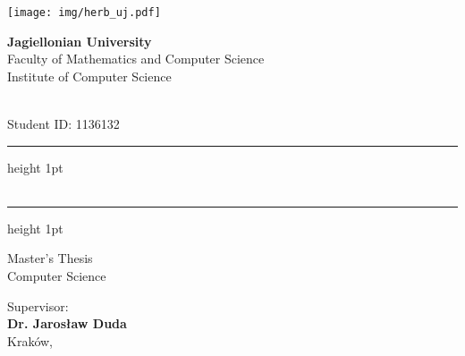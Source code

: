 \begin{titlepage}
  \setlength{\parindent}{0pt}
  \setlength{\parskip}{0pt}
  \makeatletter
  \def\myhrulefill{\leavevmode\leaders\hrule height 1pt\hfill\kern\z@}
  \makeatother

  \centering

  \texttt{[image: img/herb\_uj.pdf]}

  \vspace{0.5em}

  \Large
  \textbf{Jagiellonian University}\\
  \large
  Faculty of Mathematics and Computer Science\\
  Institute of Computer Science
  \normalsize

  \vspace{4em}

  \large
  \makeatletter
  \textbf{\@author}
  \makeatother
  \\
  \normalsize
  Student ID: 1136132

  \vspace{4em}

  \myhrulefill\\
  \huge
  \makeatletter
  \textbf{\textsc{
    \@title
  }}
  \makeatother
  \\
  \vspace{-0.5em}
  \myhrulefill

  \normalsize
  \vspace{4em}

  \large
  Master's Thesis\\
  Computer Science

  \vfill

  \large
  Supervisor:\\
  \textbf{Dr. Jarosław Duda}\\
  \normalsize
  \vspace{4em}
  \makeatletter
  Kraków, \@date
  \makeatother
\end{titlepage}
